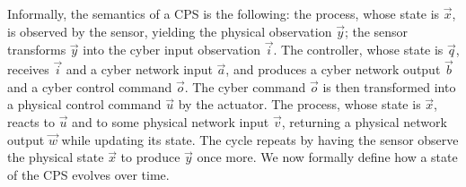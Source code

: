 Informally, the semantics of a CPS is the following: the process, whose state is $\vec{x}$, is observed by the sensor, yielding the physical observation $\vec{y}$; the sensor transforms $\vec{y}$ into the cyber input observation $\vec{i}$. The controller, whose state is $\vec{q}$, receives $\vec{i}$ and a cyber network input $\vec{a}$, and produces a cyber network output $\vec{b}$ and a cyber control command $\vec{o}$. The cyber command $\vec{o}$ is then transformed into a physical control command $\vec{u}$ by the actuator. The process, whose state is $\vec{x}$, reacts to $\vec{u}$ and to some physical network input $\vec{v}$, returning a physical network output $\vec{w}$ while updating its state. The cycle repeats by having the sensor observe the physical state $\vec{x}$ to produce $\vec{y}$ once more. We now formally define how a state of the CPS evolves over time. 
